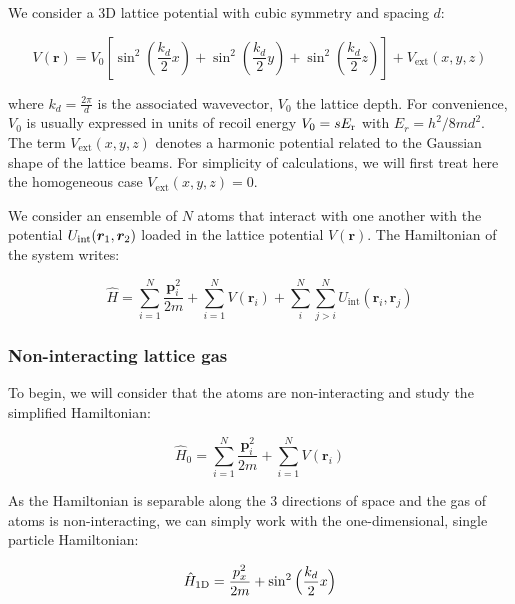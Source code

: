 We consider a 3D lattice potential with cubic symmetry and spacing $d$:

\begin{equation}
    V(\bm{r})=V_{0}\left[\sin ^{2}\left(\frac{k_{d}}{2} x\right)+\sin ^{2}\left(\frac{k_{d}}{2} y\right)+\sin ^{2}\left(\frac{k_{d}}{2} z\right)\right] + V_{\mathrm{ext}} (x,y,z)
\end{equation}

\noindent where $k_d=\frac{2 \pi}{d}$ is the associated wavevector, $V_0$ the lattice depth. For convenience, $V_0$ is usually expressed in units of recoil energy $V_0 = s E_{\rm{r}}$ with $E_r=h^2/ 8 m d^2$. The term $V_{\mathrm{ext}} (x,y,z)$ denotes a harmonic potential related to the Gaussian shape of the lattice beams. For simplicity of calculations, we will first treat here the homogeneous case $V_{\mathrm{ext}} (x,y,z)=0$.

We consider an ensemble of $N$ atoms that interact with one another with the potential $U_{\rm{int}} ( \bm{r}_1, \bm{r}_2)$ loaded in the lattice potential $V(\bm{r})$. The Hamiltonian of the system writes:

\begin{equation}
    \hat{H}=\sum_{i=1}^{N} \frac{\bm{p}_{i}^{2}}{2 m}+\sum_{i=1}^{N} V\left(\bm{r}_{i}\right) + \sum_{i}^{N} \sum_{j>i}^{N} U_{\text{int}}\left(\bm{r}_{i}, \bm{r}_{j}\right)
    \label{eq:H_lattice_full}
\end{equation}

\subsubsection{Non-interacting lattice gas}

To begin, we will consider that the atoms are non-interacting and study the simplified Hamiltonian:

\begin{equation}
    \hat{H}_0=\sum_{i=1}^{N} \frac{\bm{p}_{i}^{2}}{2 m}+\sum_{i=1}^{N} V\left(\bm{r}_{i}\right)
\end{equation}

\noindent As the Hamiltonian is separable along the 3 directions of space and the gas of atoms is non-interacting, we can simply work with the one-dimensional, single particle Hamiltonian:

\begin{equation}
    \hat{H}_{\rm{1D}} = \frac{p_x^2}{2m} + \sin^2 \Big(\frac{k_d}{2} x \Big)
\end{equation}

